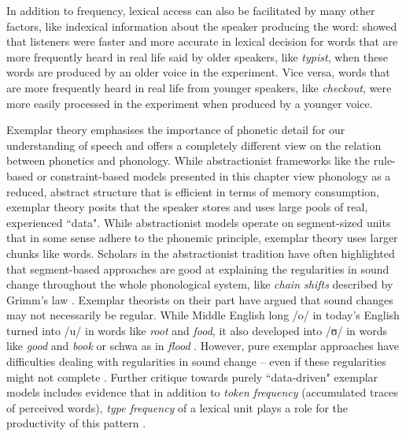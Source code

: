 In addition to frequency, lexical access can also be facilitated by many other factors, like indexical information about the speaker producing the word: \cite{WalkerHay2011} showed that listeners were faster and more accurate in lexical decision for words that are more frequently heard in real life said by older speakers, like \emph{typist}, when these words are produced by an older voice in the experiment. Vice versa, words that are more frequently heard in real life from younger speakers, like \emph{checkout}, were more easily processed in the experiment when produced by a younger voice.

Exemplar theory emphasises the importance of phonetic detail for our understanding of speech and offers a completely different view on the relation between phonetics and phonology. While abstractionist frameworks like the rule-based or constraint-based models presented in this chapter view phonology as a reduced, abstract structure that is efficient in terms of memory consumption, exemplar theory posits that the speaker stores and uses large pools of real, experienced ``data". While abstractionist models operate on segment-sized units that in some sense adhere to the phonemic principle, exemplar theory uses larger chunks like words. Scholars in the abstractionist tradition have often highlighted that segment-based approaches are good at explaining the regularities in sound change throughout the whole phonological system, like \emph{chain shifts} described by Grimm's law \citep{Guy2014}. Exemplar theorists on their part have argued that sound changes may not necessarily be regular. While Middle English long /o/ in today's English turned into /u/ in words like \emph{root} and \emph{food}, it also developed into /ʊ/ in words like \emph{good} and \emph{book} or schwa as in \emph{flood} \citep{Guy2014}. However, pure exemplar approaches have difficulties dealing with regularities in sound change – even if these regularities might not complete \citep{Pierrehumbert2016}. Further critique towards purely ``data-driven" exemplar models includes evidence that in addition to \emph{token frequency} (accumulated traces of perceived words), \emph{type frequency} of a lexical unit plays a role for the productivity of this pattern \citep{HayPierrehumbertBeckman2004}. 

